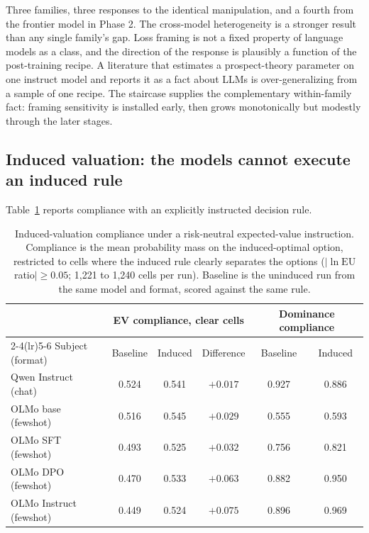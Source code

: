 \documentclass[11pt]{article}
\begin{document}
Three families, three responses to the identical manipulation, and a fourth from the frontier model in
Phase 2. The cross-model heterogeneity is a stronger result than any single family's gap. Loss framing
is not a fixed property of language models as a class, and the direction of the response is plausibly a
function of the post-training recipe. A literature that estimates a prospect-theory parameter on one
instruct model and reports it as a fact about LLMs is over-generalizing from a sample of one recipe. The
staircase supplies the complementary within-family fact: framing sensitivity is installed early, then
grows monotonically but modestly through the later stages.

\subsection{Induced valuation: the models cannot execute an induced rule}\label{sec:induced}
Table~\ref{tab:induced} reports compliance with an explicitly instructed decision rule.

\begin{table}[h]
\centering
\caption{Induced-valuation compliance under a risk-neutral expected-value instruction. Compliance is the
mean probability mass on the induced-optimal option, restricted to cells where the induced rule clearly
separates the options ($|\ln \mathrm{EU}$ ratio$| \ge 0.05$; 1{,}221 to 1{,}240 cells per run). Baseline
is the uninduced run from the same model and format, scored against the same rule.}
\label{tab:induced}
\begin{tabular}{@{}lccccc@{}}
\toprule
 & \multicolumn{3}{c}{EV compliance, clear cells} & \multicolumn{2}{c}{Dominance compliance} \\
\cmidrule(lr){2-4}\cmidrule(lr){5-6}
Subject (format) & Baseline & Induced & Difference & Baseline & Induced \\
\midrule
Qwen Instruct (chat)  & 0.524 & 0.541 & $+0.017$ & 0.927 & 0.886 \\
OLMo base (fewshot)   & 0.516 & 0.545 & $+0.029$ & 0.555 & 0.593 \\
OLMo SFT (fewshot)    & 0.493 & 0.525 & $+0.032$ & 0.756 & 0.821 \\
OLMo DPO (fewshot)    & 0.470 & 0.533 & $+0.063$ & 0.882 & 0.950 \\
OLMo Instruct (fewshot) & 0.449 & 0.524 & $+0.075$ & 0.896 & 0.969 \\
\bottomrule
\end{tabular}
\end{table}
\end{document}
